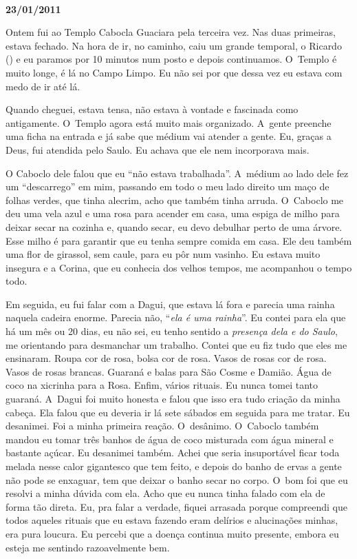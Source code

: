 \begin{center}\asterisc{}​\end{center}

\begin{flushright}\textbf{}\end{flushright}

\begin{flushright}\textbf{23/01/2011}\end{flushright}


Ontem fui ao Templo Cabocla Guaciara pela terceira vez. Nas duas
primeiras, estava fechado. Na hora de ir, no caminho, caiu um grande
temporal, o Ricardo () e eu paramos por 10 minutos num posto e depois
continuamos. O~Templo é muito longe, é lá no Campo Limpo. Eu não sei por
que dessa vez eu estava com medo de ir até lá.

Quando cheguei, estava tensa, não estava à vontade e fascinada como
antigamente. O~Templo agora está muito mais organizado. A~gente preenche
uma ficha na entrada e já sabe que médium vai atender a gente. Eu,
graças a Deus, fui atendida pelo Saulo. Eu achava que ele nem
incorporava mais.

O Caboclo dele falou que eu ``não estava trabalhada''. A~médium ao lado
dele fez um ``descarrego'' em mim, passando em todo o meu lado direito
um maço de folhas verdes, que tinha alecrim, acho que também tinha
arruda. O~Caboclo me deu uma vela azul e uma rosa para acender em casa,
uma espiga de milho para deixar secar na cozinha e, quando secar, eu
devo debulhar perto de uma árvore. Esse milho é para garantir que eu
tenha sempre comida em casa. Ele deu também uma flor de girassol, sem
caule, para eu pôr num vasinho. Eu estava muito insegura e a Corina, que
eu conhecia dos velhos tempos, me acompanhou o tempo todo.

Em seguida, eu fui falar com a Dagui, que estava lá fora e parecia uma
rainha naquela cadeira enorme. Parecia não, ``\emph{ela é uma rainha}''.
Eu contei para ela que há um mês ou 20 dias, eu não sei, eu tenho
sentido a \emph{presença dela e do Saulo}, me orientando para desmanchar
um trabalho. Contei que eu fiz tudo que eles me ensinaram. Roupa cor de
rosa, bolsa cor de rosa. Vasos de rosas cor de rosa. Vasos de rosas
brancas. Guaraná e balas para São Cosme e Damião. Água de coco na
xicrinha para a Rosa. Enfim, vários rituais. Eu nunca tomei tanto
guaraná. A~Dagui foi muito honesta e falou que isso era tudo criação da
minha cabeça. Ela falou que eu deveria ir lá sete sábados em seguida
para me tratar. Eu desanimei. Foi a minha primeira reação. O~desânimo. O~Caboclo também mandou eu tomar três banhos de água de coco misturada com
água mineral e bastante açúcar. Eu desanimei também. Achei que seria
insuportável ficar toda melada nesse calor gigantesco que tem feito, e
depois do banho de ervas a gente não pode se enxaguar, tem que deixar o
banho secar no corpo. O~bom foi que eu resolvi a minha dúvida com ela.
Acho que eu nunca tinha falado com ela de forma tão direta. Eu, pra
falar a verdade, fiquei arrasada porque compreendi que todos aqueles
rituais que eu estava fazendo eram delírios e alucinações minhas, era
pura loucura. Eu percebi que a doença continua muito presente, embora eu
esteja me sentindo razoavelmente bem.

